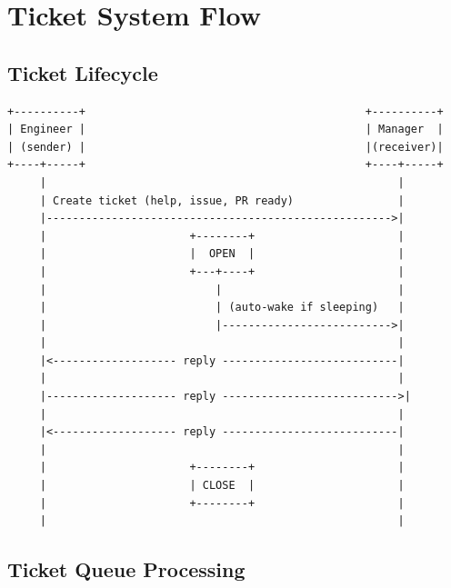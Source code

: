 \documentclass[11pt,a4paper]{article}
\begin{document}
\section{Ticket System Flow}

\subsection{Ticket Lifecycle}

\begin{verbatim}
+----------+                                           +----------+
| Engineer |                                           | Manager  |
| (sender) |                                           |(receiver)|
+----+-----+                                           +----+-----+
     |                                                      |
     | Create ticket (help, issue, PR ready)                |
     |----------------------------------------------------->|
     |                      +--------+                      |
     |                      |  OPEN  |                      |
     |                      +---+----+                      |
     |                          |                           |
     |                          | (auto-wake if sleeping)   |
     |                          |-------------------------->|
     |                                                      |
     |<------------------- reply ---------------------------|
     |                                                      |
     |-------------------- reply --------------------------->|
     |                                                      |
     |<------------------- reply ---------------------------|
     |                                                      |
     |                      +--------+                      |
     |                      | CLOSE  |                      |
     |                      +--------+                      |
     |                                                      |
\end{verbatim}

\subsection{Ticket Queue Processing}
\end{document}
